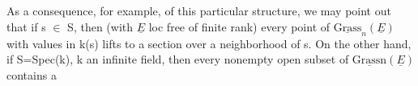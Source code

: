 As a consequence, for example, of this particular structure,
we may point out that if s $\in$ S, then (with $\underline{E}$ loc free of finite rank)
every point of $\underline{\text{Grass}}_n(\underline{E})$ with values in k(s) lifts to a section
over a neighborhood of s. On the other hand, if S=Spec(k),  k
an infinite field, then every nonempty open subset of $\underline{\text{Grassn}}(\underline{E})$ contains a

